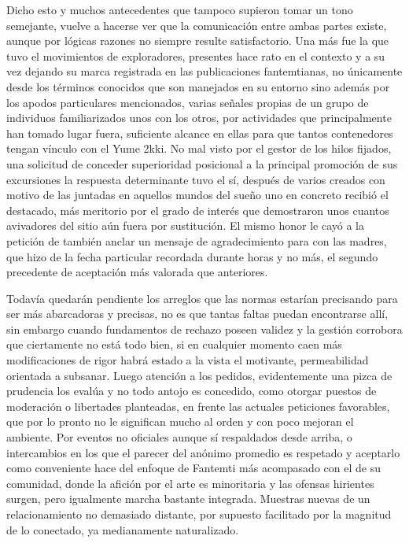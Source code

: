 \documentclass[
]{book}
\begin{document}
Dicho esto y muchos antecedentes que tampoco supieron tomar un tono semejante, vuelve a hacerse ver que la comunicación entre ambas partes existe, aunque por lógicas razones no siempre resulte satisfactorio. Una más fue la que tuvo el movimientos de exploradores, presentes hace rato en el contexto y a su vez dejando su marca registrada en las publicaciones fantemtianas, no únicamente desde los términos conocidos que son manejados en su entorno sino además por los apodos particulares mencionados, varias señales propias de un grupo de individuos familiarizados unos con los otros, por actividades que principalmente han tomado lugar fuera, suficiente alcance en ellas para que tantos contenedores tengan vínculo con el Yume 2kki. No mal visto por el gestor de los hilos fijados, una solicitud de conceder superioridad posicional a la principal promoción de sus excursiones la respuesta determinante tuvo el sí, después de varios creados con motivo de las juntadas en aquellos mundos del sueño uno en concreto recibió el destacado, más meritorio por el grado de interés que demostraron unos cuantos avivadores del sitio aún fuera por sustitución. El mismo honor le cayó a la petición de también anclar un mensaje de agradecimiento para con las madres, que hizo de la fecha particular recordada durante horas y no más, el segundo precedente de aceptación más valorada que anteriores.

Todavía quedarán pendiente los arreglos que las normas estarían precisando para ser más abarcadoras y precisas, no es que tantas faltas puedan encontrarse allí, sin embargo cuando fundamentos de rechazo poseen validez y la gestión corrobora que ciertamente no está todo bien, si en cualquier momento caen más modificaciones de rigor habrá estado a la vista el motivante, permeabilidad orientada a subsanar. Luego atención a los pedidos, evidentemente una pizca de prudencia los evalúa y no todo antojo es concedido, como otorgar puestos de moderación o libertades planteadas, en frente las actuales peticiones favorables, que por lo pronto no le significan mucho al orden y con poco mejoran el ambiente. Por eventos no oficiales aunque sí respaldados desde arriba, o intercambios en los que el parecer del anónimo promedio es respetado y aceptarlo como conveniente hace del enfoque de Fantemti más acompasado con el de su comunidad, donde la afición por el arte es minoritaria y las ofensas hirientes surgen, pero igualmente marcha bastante integrada. Muestras nuevas de un relacionamiento no demasiado distante, por supuesto facilitado por la magnitud de lo conectado, ya medianamente naturalizado.
\end{document}
